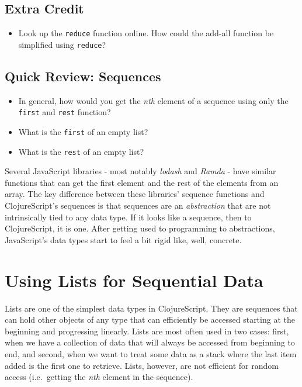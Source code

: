 \documentclass[10pt,twoside,openright]{memoir}
\begin{document}
\subsection{Extra Credit}

\begin{itemize}
\tightlist
\item
  Look up the \texttt{reduce} function online. How could the add-all
  function be simplified using \texttt{reduce}?
\end{itemize}


\subsection{Quick Review: Sequences}

\begin{itemize}
\tightlist
\item
  In general, how would you get the \emph{nth} element of a sequence
  using only the \texttt{first} and \texttt{rest} function?
\item
  What is the \texttt{first} of an empty list?
\item
  What is the \texttt{rest} of an empty list?
\end{itemize}

\begin{notice}[title={It's all about abstraction}]
Several JavaScript libraries - most notably \emph{lodash} and
\emph{Ramda} - have similar functions that can get the first element and
the rest of the elements from an array. The key difference between these
libraries' sequence functions and ClojureScript's sequences is that
sequences are an \emph{abstraction} that are not intrinsically tied to
any data type. If it looks like a sequence, then to ClojureScript, it is
one. After getting used to programming to abstractions, JavaScript's
data types start to feel a bit rigid like, well, concrete.  
\end{notice}

\section{Using Lists for Sequential Data}

Lists are one of the simplest data types in ClojureScript. They are
sequences that can hold other objects of any type that can efficiently
be accessed starting at the beginning and progressing linearly. Lists
are most often used in two cases: first, when we have a collection of
data that will always be accessed from beginning to end, and second,
when we want to treat some data as a stack where the last item added is
the first one to retrieve. Lists, however, are not efficient for random
access (i.e.~getting the \emph{nth} element in the sequence).
\end{document}
